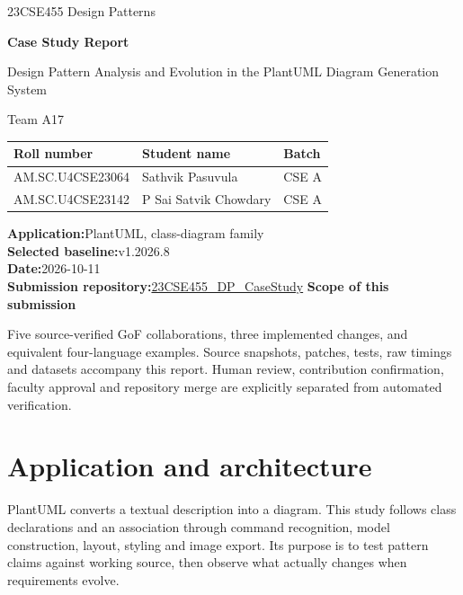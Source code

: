 \documentclass[11pt,a4paper]{article}
\begin{document}
\begin{titlepage}
\vspace*{10mm}
{\large 23CSE455 Design Patterns\par}
\vspace{16mm}
{\Huge\bfseries Case Study Report\par}
\vspace{9mm}
{\LARGE\color{ink} Design Pattern Analysis and Evolution in the PlantUML Diagram Generation System\par}
\vspace{12mm}
{\large Team A17\par}
\vspace{5mm}
\begin{tabularx}{\linewidth}{@{}lXl@{}}\toprule
Roll number & Student name & Batch\\\midrule
AM.SC.U4CSE23064 & Sathvik Pasuvula & CSE A\\
AM.SC.U4CSE23142 & P Sai Satvik Chowdary & CSE A\\\bottomrule
\end{tabularx}
\par\vspace{7mm}\noindent
\textbf{Application:}\hspace{0.6em}PlantUML, class-diagram family\\
\textbf{Selected baseline:}\hspace{0.6em}v1.2026.8\\
\textbf{Date:}\hspace{0.6em}2026-10-11\\
\textbf{Submission repository:}\hspace{0.6em}\href{https://github.com/aswathymohan-amrita/23CSE455_DP_CaseStudy}{23CSE455\_DP\_CaseStudy}
\vfill
\textbf{Scope of this submission}\par
Five source-verified GoF collaborations, three implemented changes, and equivalent
four-language examples. Source snapshots, patches, tests, raw timings and datasets
accompany this report. Human review, contribution confirmation, faculty approval
and repository merge are explicitly separated from automated verification.
\end{titlepage}
\tableofcontents\newpage
\section{Application and architecture}
PlantUML converts a textual description into a diagram. This study follows class
declarations and an association through command recognition, model construction,
layout, styling and image export. Its purpose is to test pattern claims against
working source, then observe what actually changes when requirements evolve.
\end{document}
